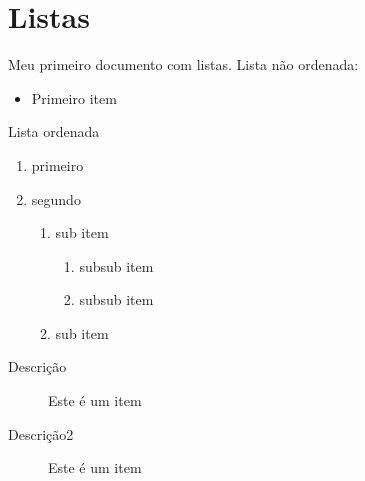 \documentclass{article}
\begin{document}
	\section{Listas}
	Meu primeiro documento com listas.
	\newline Lista não ordenada:
	\begin{itemize}
		\item Primeiro item
		
	\end{itemize}
	Lista ordenada
	\begin{enumerate}
		\item primeiro
		\item segundo
			\begin{enumerate}
				\item sub item
					\begin{enumerate}
					\item subsub item
					\item subsub item
				\end{enumerate}
				\item sub item
			\end{enumerate}
	\end{enumerate}

	\begin{description}
		\item[Descrição]  Este é um item
		\item[Descrição2]  Este é um item
	\end{description}



	
\end{document}
